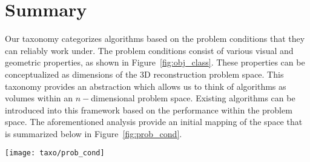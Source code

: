 \section{Summary}
Our taxonomy categorizes algorithms based on the problem conditions that they can reliably work under. The problem conditions consist of various visual and geometric properties, as shown in Figure~\ref{fig:obj_class}. These properties can be conceptualized as dimensions of the 3D reconstruction problem space. This taxonomy provides an abstraction which allows us to think of algorithms as volumes within an $n-$dimensional problem space. Existing algorithms can be introduced into this framework based on the performance within the problem space. The aforementioned analysis provide an initial mapping of the space that is summarized below in Figure~\ref{fig:prob_cond}.
\begin{figure*}[!htbp]
\centering
\texttt{[image: taxo/prob\_cond]}
\caption{Four classes of problem conditions of interest with the proposed label.}
\label{fig:prob_cond}
\end{figure*}